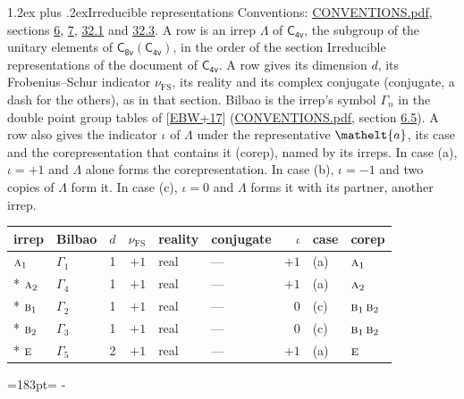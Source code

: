 \documentclass[10pt,a4paper]{article}
\makeatletter
\renewcommand\section{\@startsection{section}{1}{\z@}{-3ex plus -1ex minus -.2ex}%
  {1.2ex plus .2ex}{\normalfont\large\sffamily\bfseries\color{parttitle}}}
\newcommand{\needspace}[1]{\par\penalty-100\begingroup\dimen0=#1\relax\dimen2=\pagegoal
  \advance\dimen2-\pagetotal\ifdim\dimen0>\dimen2\relax\ifdim\dimen2>0pt\vfil\break\fi\fi
  \endgroup}
\numberwithin{equation}{section}
\newcommand{\eltfont}[1]{{\let\sigma\eltsigma\mathelt{#1}}}
\newcommand{\grp}[1]{\mathsf{#1}}
\newcommand{\irr}[1]{\text{\normalfont\scshape #1}}
\newcommand{\elt}[1]{\eltfont{#1}}
\newcommand{\fsind}{\nu_{\mathrm{FS}}}
\makeatother
\begin{document}
\section{Irreducible representations}\label{s:irreps}
Conventions: \href{../../CONVENTIONS.pdf}{CONVENTIONS.pdf}, sections \href{../../../rotation/CONVENTIONS.pdf\#conv.6}{6}, \href{../../../rotation/CONVENTIONS.pdf\#conv.7}{7}, \href{../../CONVENTIONS.pdf\#conv.32.1}{32.1} and \href{../../CONVENTIONS.pdf\#conv.32.3}{32.3}.
\leavevmode\label{n:irrep.Delta}A row is an irrep $\Lambda$ of $\grp{C_{4v}}$, the subgroup of the unitary elements of $\grp{C_{8v}}(\grp{C_{4v}})$, in the order of the section Irreducible representations of the document of \href{../../../rotation/data/pdf/C4v.pdf}{$\grp{C_{4v}}$}. \label{n:index.dimension}\label{n:index.frobenius}\label{n:head.irrep}\label{n:head.reality}\label{n:head.conjugate}A row gives its dimension $d$, its Frobenius--Schur indicator $\fsind$, its reality and its complex conjugate (conjugate, a dash for the others), as in that section. \label{n:head.bilbao}\label{n:irrep.alias.gamma}Bilbao is the irrep's symbol $\Gamma_n$ in the double point group tables of [\href{../../../REFERENCES.pdf\#ref.EBW+17}{EBW+17}] (\href{../../CONVENTIONS.pdf}{CONVENTIONS.pdf}, section \href{../../../rotation/CONVENTIONS.pdf\#conv.6.5}{6.5}). \label{n:head.case.corep}\label{n:head.corep}A row also gives the indicator $\iota$ of $\Lambda$ under the representative $\elt{a}$, its case and the corepresentation that contains it (corep), named by its irreps. In case (a), $\iota = +1$ and $\Lambda$ alone forms the corepresentation. In case (b), $\iota = -1$ and two copies of $\Lambda$ form it. In case (c), $\iota = 0$ and $\Lambda$ forms it with its partner, another irrep.
\setlength{\emergencystretch}{2em}\par\setlength{\emergencystretch}{0pt}
{\small\renewcommand{\arraystretch}{1.25}\setlength{\tabcolsep}{4pt}\begin{longtable}{@{}llrrllrll@{}}\toprule
irrep & Bilbao & $d$ & $\fsind$ & reality & conjugate & $\iota$ & case & corep\\\midrule\endhead
\bottomrule\endfoot\endlastfoot
$\irr{a}_{1}$ & $\Gamma_{1}$ & 1 & $+1$ & real & --- & $+1$ & (a) & $\irr{a}_{1}$\\*
$\irr{a}_{2}$ & $\Gamma_{4}$ & 1 & $+1$ & real & --- & $+1$ & (a) & $\irr{a}_{2}$\\*
$\irr{b}_{1}$ & $\Gamma_{2}$ & 1 & $+1$ & real & --- & $0$ & (c) & $\irr{b}_{1}\,\irr{b}_{2}$\\*
$\irr{b}_{2}$ & $\Gamma_{3}$ & 1 & $+1$ & real & --- & $0$ & (c) & $\irr{b}_{1}\,\irr{b}_{2}$\\*
$\irr{e}$ & $\Gamma_{5}$ & 2 & $+1$ & real & --- & $+1$ & (a) & $\irr{e}$\\
\bottomrule\end{longtable}}
\needspace{183pt}
\end{document}

